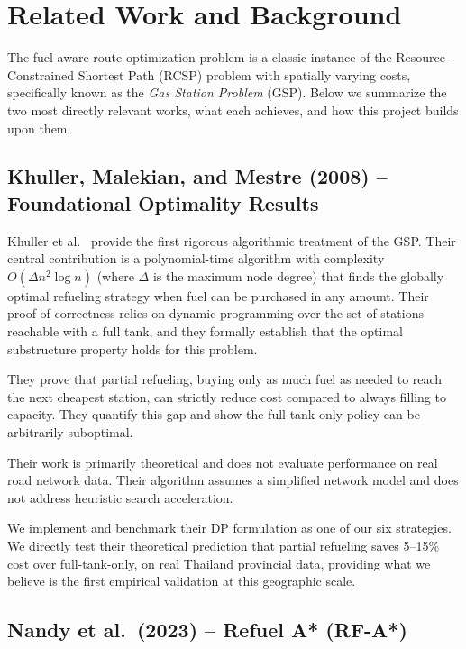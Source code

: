 \chapter{Related Work and Background}

The fuel-aware route optimization problem is a classic instance of the
Resource-Constrained Shortest Path (RCSP) problem with spatially varying costs, specifically
known as the \textit{Gas Station Problem} (GSP).
Below we summarize the two most directly relevant works, what each achieves, and how this
project builds upon them.

\section{Khuller, Malekian, and Mestre (2008) -- Foundational Optimality Results}

Khuller et al.~\cite{khuller2008} provide the first rigorous algorithmic treatment of the GSP.
Their central contribution is a polynomial-time algorithm with complexity
$O(\Delta n^{2} \log n)$ (where $\Delta$ is the maximum node degree) that finds the globally
optimal refueling strategy when fuel can be purchased in any amount.
Their proof of correctness relies on dynamic programming over the set of stations reachable
with a full tank, and they formally establish that the optimal substructure property holds for
this problem.

They prove that partial refueling, buying only as much fuel as needed to reach the next
cheapest station, can strictly reduce cost compared to always filling to capacity.
They quantify this gap and show the full-tank-only policy can be arbitrarily suboptimal.

Their work is primarily theoretical and does not evaluate performance on real road network
data.
Their algorithm assumes a simplified network model and does not address heuristic search
acceleration.

We implement and benchmark their DP formulation as one of our six strategies.
We directly test their theoretical prediction that partial refueling saves 5--15\% cost over
full-tank-only, on real Thailand provincial data, providing what we believe is the first
empirical validation at this geographic scale.

\section{Nandy et al.\ (2023) -- Refuel A* (RF-A*)}

